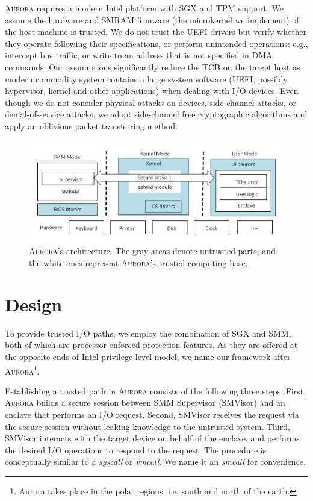 \textsc{Aurora} requires a modern Intel platform with SGX and TPM support. We assume the hardware and SMRAM firmware (the microkernel we implement) of the host machine is trusted. We do not trust the UEFI drivers but verify whether they operate following their specifications, or perform unintended operations: e.g., intercept bus traffic, or write to an address that is not specified in DMA commands. Our assumptions significantly reduce the TCB on the target host as modern commodity system contains a large system software (UEFI, possibly hypervisor, kernel and other applications) when dealing with I/O devices.  %
Even though we do not consider physical attacks on devices, side-channel attacks, or denial-of-service attacks, we adopt side-channel free cryptographic algorithms and apply an oblivious packet transferring method.

\begin{figure}[t]
	\centering
	\includegraphics[height=0.2\textheight]{figures/arch.pdf}
	\caption{\textsc{Aurora}'s architecture. The gray areas denote untrusted parts, and the white ones represent \textsc{Aurora}'s trusted computing base.}
	\label{fig:architecture}
\end{figure}


\section{Design}
To provide trusted I/O paths, we employ the combination of SGX and SMM, both of which are processor enforced protection features. As they are offered at the opposite ends of Intel privilege-level model, we name our framework after \textsc{Aurora}\footnote{Aurora takes place in the polar regions, i.e. south and north of the earth.}.

Establishing a trusted path in \textsc{Aurora} consists of the following three steps. First, \textsc{Aurora} builds a secure session between SMM Supervisor (SMVisor) and an enclave that performs an I/O request. Second, SMVisor receives the request via the secure session without leaking knowledge to the untrusted system. Third, SMVisor interacts with the target device on behalf of the enclave, and performs the desired I/O operations to respond to the request. The procedure is conceptually similar to a \textit{syscall} or \textit{vmcall}. We name it an \textit{smcall} for convenience.

